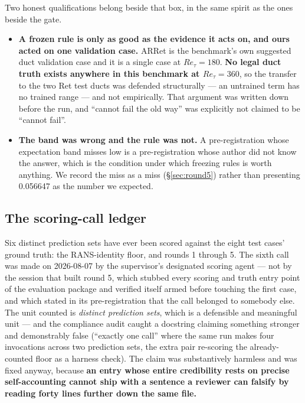 \documentclass[11pt,a4paper]{article}
\newcommand{\breakus}{\textunderscore\allowbreak}
\newcommand{\code}[1]{{\small\ttfamily\let\_\breakus #1}}
\begin{document}
\medskip
Two honest qualifications belong beside that box, in the same spirit as the ones beside the
gate.

\begin{itemize}
\item \textbf{A frozen rule is only as good as the evidence it acts on, and ours acted on
  one validation case.} \code{AR\_7\_Ret\_180} is the benchmark's own suggested duct
  validation case and it is a single case at $Re_\tau = 180$. \textbf{No legal duct truth
  exists anywhere in this benchmark at $Re_\tau = 360$}, so the transfer to the two
  \code{Ret\_360} test ducts was defended structurally --- an untrained term has no trained
  range --- and not empirically. That argument was written down before the run, and ``cannot
  fail the old way'' was explicitly not claimed to be ``cannot fail''.
\item \textbf{The band was wrong and the rule was not.} A pre-registration whose
  expectation band misses low is a pre-registration whose author did not know the answer,
  which is the condition under which freezing rules is worth anything. We record the miss
  as a miss (\S\ref{sec:round5}) rather than presenting 0.056647 as the number we expected.
\end{itemize}

\subsection{The scoring-call ledger}
\label{sec:ledger}

Six distinct prediction sets have ever been scored against the eight test cases' ground
truth: the RANS-identity floor, and rounds 1 through 5. The sixth call was made on
2026-08-07 by the supervisor's designated scoring agent --- not by the session that built
round 5, which stubbed every scoring and truth entry point of the evaluation package and
verified itself armed before touching the first case, and which stated in its
pre-registration that the call belonged to somebody else. The unit counted is
\emph{distinct prediction sets}, which is a defensible and meaningful unit --- and the
compliance audit caught a docstring claiming something stronger and demonstrably false
(``exactly one call'' where the same run makes four invocations across two prediction sets,
the extra pair re-scoring the already-counted floor as a harness check). The claim was
substantively harmless and was fixed anyway, because \textbf{an entry whose entire
credibility rests on precise self-accounting cannot ship with a sentence a reviewer can
falsify by reading forty lines further down the same file.}
\end{document}
